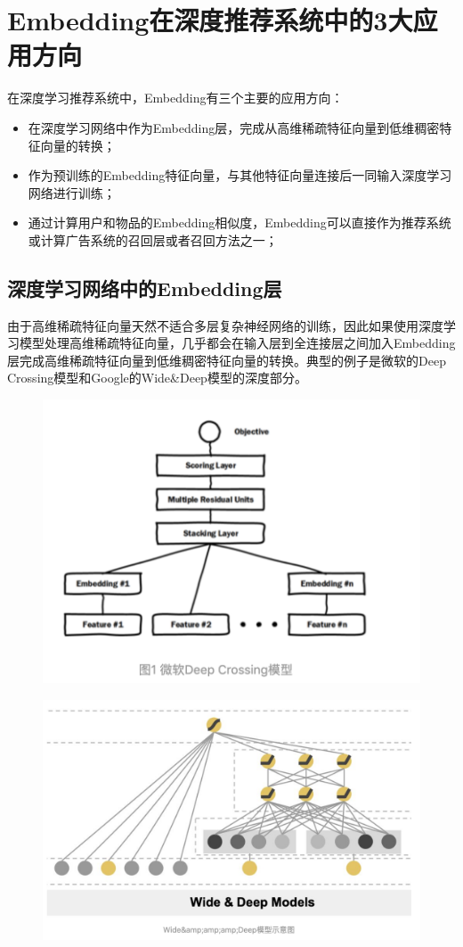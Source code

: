\documentclass[12pt]{article}
\begin{document}
\section{Embedding在深度推荐系统中的3大应用方向
\cite{Three_Application_Of_Embedding_In_Reference_System}}

在深度学习推荐系统中，Embedding有三个主要的应用方向：
\begin{itemize}
\setlength{\itemsep}{0pt}
\setlength{\parsep}{0pt}
\setlength{\parskip}{0pt}
    \item 在深度学习网络中作为Embedding层，完成从高维稀疏特征向量到低维稠密特征向量的转换；
    \item 作为预训练的Embedding特征向量，与其他特征向量连接后一同输入深度学习网络进行训练；
    \item 通过计算用户和物品的Embedding相似度，Embedding可以直接作为推荐系统或计算广告系统的召回层或者召回方法之一；
\end{itemize}

\subsection{深度学习网络中的Embedding层}
由于高维稀疏特征向量天然不适合多层复杂神经网络的训练，因此如果使用深度学习模型处理高维稀疏特征向量，几乎都会在输入层到全连接层之间加入Embedding层完成高维稀疏特征向量到低维稠密特征向量的转换。典型的例子是微软的Deep Crossing模型和Google的Wide\&Deep模型的深度部分。
\begin{figure}[H]
    \centering
    \includegraphics[width=.8\textwidth]{fig/Microsoft_Deep_Crossing_Strucure.png}
\end{figure}
\begin{figure}[H]
    \centering
    \includegraphics[width=.8\textwidth]{fig/Wide_Deep_Structure.png}
\end{figure}
\end{document}
